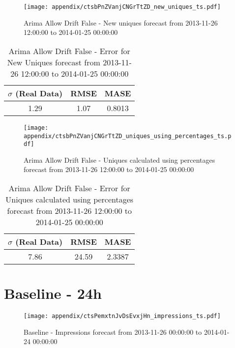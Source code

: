 \begin{figure}[H] \begin{center} \leavevmode
\texttt{[image: appendix/ctsbPnZVanjCNGrTtZD\_new\_uniques\_ts.pdf]} \caption[]{
Arima Allow Drift False - New uniques forecast from 2013-11-26 12:00:00 to 2014-01-25 00:00:00} \label{fig:appendix/ctsbPnZVanjCNGrTtZD_new_uniques_ts.pdf} \end{center}
\end{figure}

\begin{table}[H]
\centering
\footnotesize
\begin{tabular}{ccc}
$\sigma$ (Real Data) & RMSE & MASE   \\ \hline
1.29 & 1.07 & 0.8013 \\
\end{tabular}

\vspace{0.5cm}

\caption[]{
Arima Allow Drift False - Error for New Uniques forecast from 2013-11-26 12:00:00 to 2014-01-25 00:00:00}
\end{table}

\begin{figure}[H] \begin{center} \leavevmode
\texttt{[image: appendix/ctsbPnZVanjCNGrTtZD\_uniques\_using\_percentages\_ts.pdf]} \caption[]{
Arima Allow Drift False - Uniques calculated using percentages forecast from 2013-11-26 12:00:00 to 2014-01-25 00:00:00} \label{fig:appendix/ctsbPnZVanjCNGrTtZD_uniques_using_percentages_ts.pdf} \end{center}
\end{figure}

\begin{table}[H]
\centering
\footnotesize
\begin{tabular}{ccc}
$\sigma$ (Real Data) & RMSE & MASE   \\ \hline
7.86 & 24.59 & 2.3387 \\
\end{tabular}

\vspace{0.5cm}

\caption[]{
Arima Allow Drift False - Error for Uniques calculated using percentages forecast from 2013-11-26 12:00:00 to 2014-01-25 00:00:00}
\end{table}

\section{Baseline - 24h}
\begin{figure}[H] \begin{center} \leavevmode
\texttt{[image: appendix/ctsPemxtnJvDsEvxjHn\_impressions\_ts.pdf]} \caption[]{
Baseline - Impressions forecast from 2013-11-26 00:00:00 to 2014-01-24 00:00:00} \label{fig:appendix/ctsPemxtnJvDsEvxjHn_impressions_ts.pdf} \end{center}
\end{figure}

